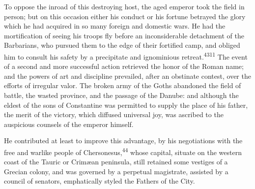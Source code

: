 To oppose the inroad of this destroying host, the aged emperor
took the field in person; but on this occasion either his conduct
or his fortune betrayed the glory which he had acquired in so
many foreign and domestic wars. He had the mortification of
seeing his troops fly before an inconsiderable detachment of the
Barbarians, who pursued them to the edge of their fortified camp,
and obliged him to consult his safety by a precipitate and
ignominious retreat.\textsuperscript{4311} The event of a second and more
successful action retrieved the honor of the Roman name; and the
powers of art and discipline prevailed, after an obstinate
contest, over the efforts of irregular valor. The broken army of
the Goths abandoned the field of battle, the wasted province, and
the passage of the Danube: and although the eldest of the sons of
Constantine was permitted to supply the place of his father, the
merit of the victory, which diffused universal joy, was ascribed
to the auspicious counsels of the emperor himself.


He contributed at least to improve this advantage, by his
negotiations with the free and warlike people of Chersonesus,\textsuperscript{44}
whose capital, situate on the western coast of the Tauric or
Crimæan peninsula, still retained some vestiges of a Grecian
colony, and was governed by a perpetual magistrate, assisted by a
council of senators, emphatically styled the Fathers of the City.

